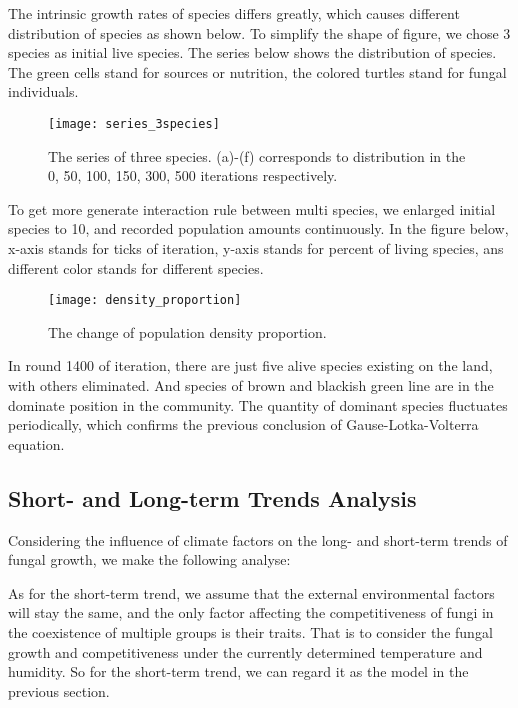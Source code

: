 \documentclass{mcmthesis}
\begin{document}
The intrinsic growth rates of species differs greatly, which causes different distribution of species as shown below. To simplify the shape of figure, we chose 3 species as initial live species. The series below shows the distribution of species. The green cells stand for sources or nutrition, the colored turtles stand for fungal individuals.

\begin{figure}[H]
  \small
  \centering
  \texttt{[image: series\_3species]}
  \caption{The series of three species. (a)-(f) corresponds to distribution in the 0, 50, 100, 150, 300, 500 iterations respectively.}
  \label{series_3species}
\end{figure}

To get more generate interaction rule between multi species, we enlarged initial species to 10, and recorded population amounts continuously. In the figure below, x-axis stands for ticks of iteration, y-axis stands for percent of living species, ans different color stands for different species.

\begin{figure}[H]
  \small
  \centering
  \texttt{[image: density\_proportion]}
  \caption{The change of population density proportion.}
  \label{density_proportion}
\end{figure}

In round 1400 of iteration, there are just five alive species existing on the land, with others eliminated. And species of brown and blackish green line are in the dominate position in the community. The quantity of dominant species fluctuates periodically, which confirms the previous conclusion of  Gause-Lotka-Volterra equation.

\subsection{Short- and Long-term Trends Analysis}

Considering the influence of climate factors on the long- and short-term trends of fungal growth, we make the following analyse: 

As for the short-term trend, we assume that the external environmental factors will stay the same, and the only factor affecting the competitiveness of fungi in the coexistence of multiple groups is their traits. That is to consider the fungal growth and competitiveness under the currently determined temperature and humidity. So for the short-term trend, we can regard it as the model in the previous section.
\end{document}
